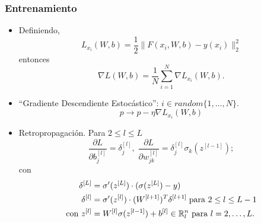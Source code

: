\documentclass[aspectratio=1610]{beamer}
\begin{document}
  
  \begin{frame}
    \frametitle{Entrenamiento}

    \begin{itemize}
    \item Definiendo,
      \begin{displaymath}
        L_{x_i}(W,b) = \frac{1}{2} \|F(x_i,W,b) - y(x_i) \|^2_2
      \end{displaymath}
      entonces
      \begin{displaymath}
        \nabla L(W,b) = \frac{1}{N} \sum_{i=1}^N \nabla L_{x_i}(W,b).
      \end{displaymath}
      
    \item \textquotedblleft Gradiente Descendiente Estoc\'astico\textquotedblright:  $i\in random\{1,\ldots,N\}$.
      \begin{displaymath}
        p \to p - \eta \nabla L_{x_i}(W,b)
      \end{displaymath}
    \item Retropropagaci\'on. Para $2 \leq l \leq L$
      \begin{displaymath}
        \frac{\partial L}{\partial b_j^{[l]}} = \delta_j^{[l]}, \; \frac{\partial L}{\partial w_{jk}^{[l]}} = \delta_j^{[l]} \sigma_k(z^{[l-1]}); 
      \end{displaymath}
con
\begin{align*}
  \delta^{[L]} &= \sigma^\prime (z^{[L]})\cdot (\sigma(z^{[L]}) -y ) \\
  \delta^{[l]} &= \sigma^\prime (z^{[l]})\cdot (W^{[l+1]})^T\delta^{[l+1]}  \; \textnormal{para } 2\leq l\leq L-1\\
 \textnormal{con } z^{[l]}&=W^{[l]}\sigma(z^{[l-1]})+b^{[l]}\in \mathbb{R}^n_l  \textnormal{ para } l=2,\ldots,L.
\end{align*}

\end{itemize}
    

\end{frame}
\end{document}
